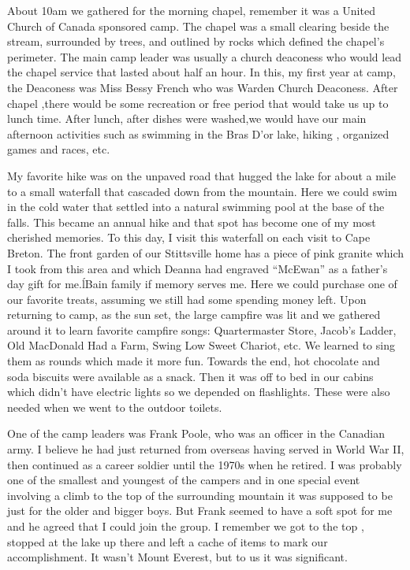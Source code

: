 About 10am we gathered for the morning chapel, remember it was a United Church of Canada sponsored camp. The chapel was a small clearing beside the stream, surrounded by trees, and outlined by rocks which defined the chapel's perimeter. The main camp leader was usually a church deaconess who would lead the chapel service that lasted about half an hour. In this, my first year at camp, the Deaconess was Miss Bessy French who was Warden Church Deaconess. After chapel ,there would be some recreation or free period that would take us up to lunch time. After lunch, after dishes were washed,we would have our main afternoon activities such as swimming in the Bras D'or lake, hiking , organized games and races, etc.

My favorite hike was on the unpaved road that hugged the lake for about a mile to a small waterfall that cascaded down from the mountain. Here we could swim in the cold water that settled into a natural swimming pool at the base of the falls. This became an annual hike and that spot has become one of my most cherished memories. To this day, I visit this waterfall on each visit to Cape Breton. The front garden of our Stittsville home has a piece of pink granite which I took from this area and which Deanna had engraved “McEwan” as a father's day gift for me.ĺBain family if memory serves me. Here we could purchase one of our favorite treats, assuming we still had some spending money left. Upon returning to camp, as the sun set, the large campfire was lit and we gathered around it to learn favorite campfire songs: Quartermaster Store, Jacob's Ladder, Old MacDonald Had a Farm, Swing Low Sweet Chariot, etc. We learned to sing them as rounds which made it more fun. Towards the end, hot chocolate and soda biscuits were available as a snack. Then it was off to bed in our cabins which didn't have electric lights so we depended on flashlights. These were also needed when we went to the outdoor toilets.

One of the camp leaders was Frank Poole, who was an officer in the Canadian army. I believe he had just returned from overseas having served in World War II, then continued as a career soldier until the 1970s when he retired. I was probably one of the smallest and youngest of the campers and in one special event involving a climb to the top of the surrounding mountain it was supposed to be just for the older and bigger boys. But Frank seemed to have a soft spot for me and he agreed that I could join the group. I remember we got to the top , stopped at the lake up there and left a cache of items to mark our accomplishment. It wasn't Mount Everest, but to us it was significant.

